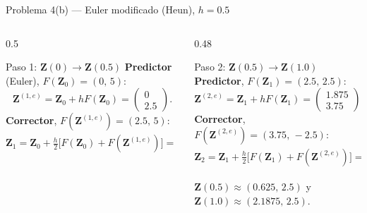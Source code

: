 \documentclass[aspectratio=169,10pt]{beamer}
\begin{document}
\begin{frame}{Problema 4(b) — Euler modificado (Heun), $h=0.5$}
\begin{columns}[T]
\begin{column}{0.5\textwidth}
\begin{cardgear}{Paso 1: $\mathbf Z(0)\to\mathbf Z(0.5)$}{\faArrowRight}
{\footnotesize \textbf{Predictor} (Euler), $F(\mathbf Z_0)=(0,\,5)$:
\[
\mathbf Z^{(1,e)}=\mathbf Z_0+hF(\mathbf Z_0)=\begin{pmatrix}0\\2.5\end{pmatrix}.
\]
\textbf{Corrector}, $F(\mathbf Z^{(1,e)})=(2.5,\,5)$:
\[
\mathbf Z_1=\mathbf Z_0+\tfrac{h}{2}\big[F(\mathbf Z_0)+F(\mathbf Z^{(1,e)})\big]=\begin{pmatrix}0.625\\ 2.5\end{pmatrix}.
\]}
\end{cardgear}
\end{column}
\begin{column}{0.48\textwidth}
\begin{cardgear}{Paso 2: $\mathbf Z(0.5)\to\mathbf Z(1.0)$}{\faArrowRight}
{\footnotesize \textbf{Predictor}, $F(\mathbf Z_1)=(2.5,\,2.5)$:
\[
\mathbf Z^{(2,e)}=\mathbf Z_1+hF(\mathbf Z_1)=\begin{pmatrix}1.875\\ 3.75\end{pmatrix}.
\]
\textbf{Corrector}, $F(\mathbf Z^{(2,e)})=(3.75,\,-2.5)$:
\[
\mathbf Z_2=\mathbf Z_1+\tfrac{h}{2}\big[F(\mathbf Z_1)+F(\mathbf Z^{(2,e)})\big]=\begin{pmatrix}2.1875\\ 2.5\end{pmatrix}.
\]}
\end{cardgear}
\vspace{1mm}
\begin{cardnota}[\faCheckCircle]
{\footnotesize $\mathbf Z(0.5)\approx(0.625,\,2.5)$ y $\mathbf Z(1.0)\approx(2.1875,\,2.5)$.}
\end{cardnota}
\end{column}
\end{columns}
\end{frame}
\end{document}
